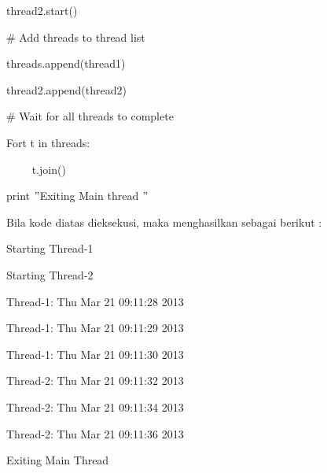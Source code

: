\documentclass{wileySix}
\begin{document}
\begin{myEnumerate}
{\fontsize{10pt}{10pt}\selectfont thread2.start()} \par
\vspace{10pt}
\noindent 
{\fontsize{10pt}{10pt}\selectfont  $  \#  $ Add threads to thread list} \par
\noindent 
{\fontsize{10pt}{10pt}\selectfont threads.append(thread1)} \par
\noindent 
{\fontsize{10pt}{10pt}\selectfont thread2.append(thread2)} \par
\vspace{10pt}
\noindent 
{\fontsize{10pt}{10pt}\selectfont  $  \#  $ Wait for all threads to complete} \par
\noindent 
{\fontsize{10pt}{10pt}\selectfont Fort t in threads:} \par
\noindent 
{\fontsize{10pt}{10pt}\selectfont ~~~~ t.join()} \par
\noindent 
{\fontsize{10pt}{10pt}\selectfont print  $ " $Exiting Main thread $ " $} \par
\vspace{10pt}
\noindent 
Bila kode diatas dieksekusi, maka menghasilkan sebagai berikut : \par
\vspace{10pt}
\noindent 
{\fontsize{10pt}{10pt}\selectfont Starting Thread-1} \par
\noindent 
{\fontsize{10pt}{10pt}\selectfont Starting Thread-2} \par
\noindent 
{\fontsize{10pt}{10pt}\selectfont Thread-1: Thu Mar 21 09:11:28 2013} \par
\noindent 
{\fontsize{10pt}{10pt}\selectfont Thread-1: Thu Mar 21 09:11:29 2013} \par
\noindent 
{\fontsize{10pt}{10pt}\selectfont Thread-1: Thu Mar 21 09:11:30 2013} \par
\noindent 
{\fontsize{10pt}{10pt}\selectfont Thread-2: Thu Mar 21 09:11:32 2013} \par
\noindent 
{\fontsize{10pt}{10pt}\selectfont Thread-2: Thu Mar 21 09:11:34 2013} \par
\noindent 
{\fontsize{10pt}{10pt}\selectfont Thread-2: Thu Mar 21 09:11:36 2013} \par
\noindent 
{\fontsize{10pt}{10pt}\selectfont Exiting Main Thread} \par
\vspace{12pt}

\end{myEnumerate}
\end{document}
